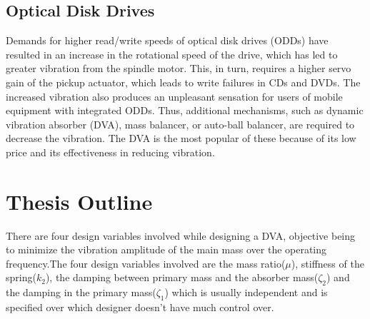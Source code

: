 \subsection{Optical Disk Drives}
Demands for higher read/write speeds of optical disk drives (ODDs) have resulted in an increase in the rotational speed of the drive, which has led to greater vibration from the spindle motor. This, in turn, requires a higher servo gain of the pickup actuator, which leads to write failures in CDs and DVDs. The increased vibration also produces an unpleasant sensation for users of mobile equipment with integrated ODDs. Thus, additional mechanisms, such as dynamic vibration absorber (DVA), mass balancer, or auto-ball balancer, are required to decrease the vibration. The DVA is the most popular of these because of its low price and its effectiveness in reducing vibration.

\section{Thesis Outline}
There are four design variables involved while designing a DVA, objective being to minimize the vibration amplitude of the main mass over the operating frequency.The four design variables involved are the mass ratio($\mu$), stiffness of the spring($k_2$), the damping between primary mass and the absorber mass($\zeta_2$) and the damping in the primary mass($\zeta_1$) which is usually independent and is specified over which designer doesn't have much control over.\\

